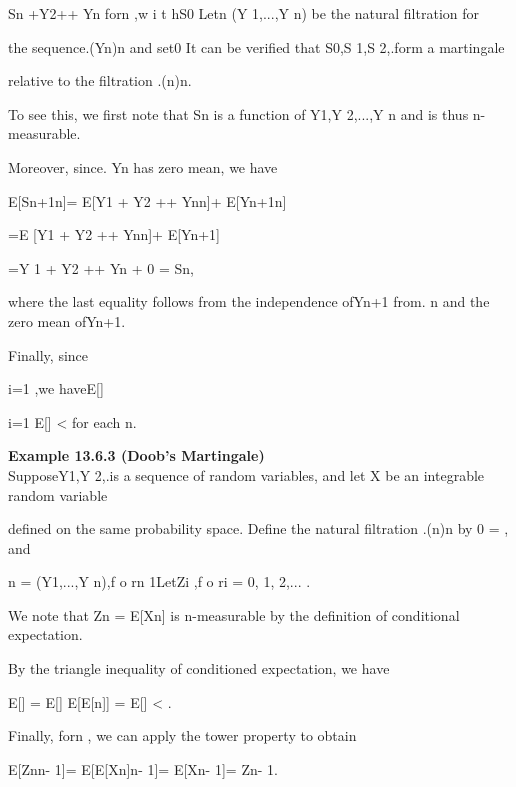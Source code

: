 Sn +Y2+\cdot\cdot\cdot+ Yn forn ,w i t hS0  Letn \coloneqq\sigma(Y 1,...,Y n) be the natural filtration for

the sequence.(Yn)n and set0 \coloneqq{\emptyset ,\Omega }It can be verified that S0,S 1,S 2,.form a martingale

relative to the filtration .(n)n.

To see this, we first note that Sn is a function of Y1,Y 2,...,Y n and is thus n-measurable.

Moreover, since. Yn has zero mean, we have

E[Sn+1\vert{}n]= E[Y1 + Y2 +\cdot\cdot\cdot+ Yn\vert{}n]+ E[Yn+1\vert{}n]

=E [Y1 + Y2 +\cdot\cdot\cdot+ Yn\vert{}n]+ E[Yn+1]

=Y 1 + Y2 +\cdot\cdot\cdot+ Yn + 0 = Sn,

where the last equality follows from the independence ofYn+1 from. n and the zero mean ofYn+1.

Finally, since\vertSn\vert\leq \sumn

i=1 \vertYi\vert,we haveE[\vertSn\vert] \leq \sumn

i=1 E[\vertYi\vert] < \infty for each n.

\textbf{Example 13.6.3 (Doob's Martingale)} \\

SupposeY1,Y 2,.is a sequence of random variables, and let X be an integrable random variable

defined on the same probability space. Define the natural filtration .(n)n by 0 ={ \emptyset,\Omega } and

n = \sigma(Y1,...,Y n),f o rn \geq 1LetZi ,f o ri = 0, 1, 2,... .

We note that Zn = E[X\vert{}n] is n-measurable by the definition of conditional expectation.

By the triangle inequality of conditioned expectation, we have

E[\vertZn\vert] = E[\vert] \leq E[E[\vertX\vert\vert{}n]] = E[\vertX\vert] < \infty .

Finally, forn , we can apply the tower property to obtain

E[Zn\vert{}n- 1]= E[E[X\vert{}n]\vert{}n- 1]= E[X\vert{}n- 1]= Zn- 1.

